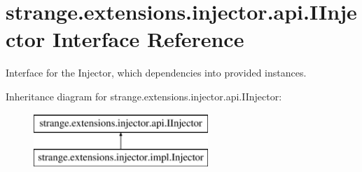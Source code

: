 \hypertarget{interfacestrange_1_1extensions_1_1injector_1_1api_1_1_i_injector}{\section{strange.\-extensions.\-injector.\-api.\-I\-Injector Interface Reference}
\label{interfacestrange_1_1extensions_1_1injector_1_1api_1_1_i_injector}
}


Interface for the Injector, which dependencies into provided instances.  


Inheritance diagram for strange.\-extensions.\-injector.\-api.\-I\-Injector\-:\begin{figure}[H]
\begin{center}
\leavevmode
\includegraphics[height=2.000000cm]{interfacestrange_1_1extensions_1_1injector_1_1api_1_1_i_injector}
\end{center}
\end{figure}
